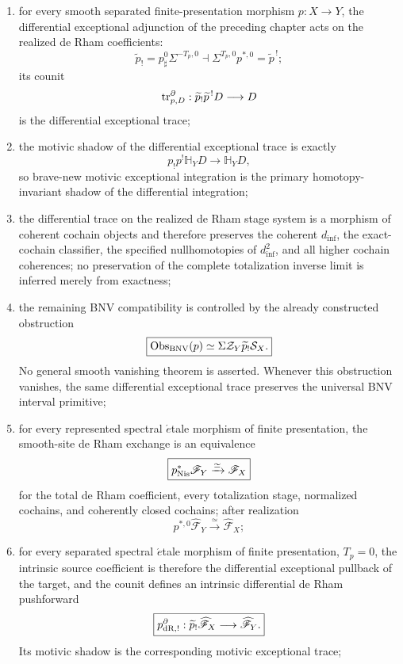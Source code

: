 \begin{theorem}
\begin{enumerate}
\item for every smooth separated finite-presentation morphism
\(p:X\to Y\), the differential exceptional adjunction of the preceding
chapter acts on the realized de Rham coefficients:
\[
\boxed{
    \widetilde p_!
    =
    p_\sharp^0\Sigma^{-T_p,0}
    \dashv
    \Sigma^{T_p,0}p^{*,0}
    =
    \widetilde p^{\,!};
}
\]
its counit
\[
    \operatorname{tr}^{\partial}_{p,D}:
    \widetilde p_!\widetilde p^{\,!}D
    \longrightarrow
    D
\]
is the differential exceptional trace;

\item the motivic shadow of the differential exceptional trace is exactly
\[
\boxed{
    p_!p^!\mathbb H_YD
    \longrightarrow
    \mathbb H_YD,
}
\]
so brave-new motivic exceptional integration is the primary
homotopy-invariant shadow of the differential integration;

\item the differential trace on the realized de Rham stage system is a
morphism of coherent cochain objects and therefore preserves the coherent
\(d_{\inf}\), the exact-cochain classifier, the specified nullhomotopies of
\(d_{\inf}^2\), and all higher cochain coherences; no preservation of the
complete totalization inverse limit is inferred merely from exactness;

\item the remaining BNV compatibility is controlled by the already
constructed obstruction
\[
\boxed{
    \operatorname{Obs}_{\mathrm{BNV}}(p)
    \simeq
    \Sigma\mathcal Z_Y\widetilde p_!\mathcal S_X.
}
\]
No general smooth vanishing theorem is asserted.  Whenever this obstruction
vanishes, the same differential exceptional trace preserves the universal BNV
interval primitive;

\item for every represented spectral \(\acute{e}\)tale morphism of finite
presentation, the smooth-site de Rham exchange is an equivalence
\[
\boxed{
    p^*_{\mathrm{Nis}}\mathscr F_Y
    \xrightarrow{\simeq}
    \mathscr F_X
}
\]
for the total de Rham coefficient, every totalization stage, normalized
cochains, and coherently closed cochains; after realization
\[
    p^{*,0}\widehat{\mathscr F}_Y
    \xrightarrow{\simeq}
    \widehat{\mathscr F}_X;
\]

\item for every separated spectral \(\acute{e}\)tale morphism of finite
presentation, \(T_p=0\), the intrinsic source coefficient is therefore the
differential exceptional pullback of the target, and the counit defines an
intrinsic differential de Rham pushforward
\[
\boxed{
    p_{\mathrm{dR},!}^{\partial}:
    \widetilde p_!\widehat{\mathscr F}_X
    \longrightarrow
    \widehat{\mathscr F}_Y.
}
\]
Its motivic shadow is the corresponding motivic exceptional trace;


\end{enumerate}
\end{theorem}
